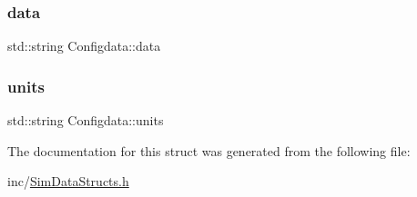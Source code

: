 \subsubsection{\texorpdfstring{data}{data}}
{\footnotesize\ttfamily std\+::string Configdata\+::data}

\hypertarget{struct_configdata_a5fd9c1be63267f3330fcc056d5b8edaa}{}\label{struct_configdata_a5fd9c1be63267f3330fcc056d5b8edaa} 
\subsubsection{\texorpdfstring{units}{units}}
{\footnotesize\ttfamily std\+::string Configdata\+::units}



The documentation for this struct was generated from the following file\+:\begin{DoxyCompactItemize}
\item 
inc/\hyperlink{_sim_data_structs_8h}{Sim\+Data\+Structs.\+h}\end{DoxyCompactItemize}
